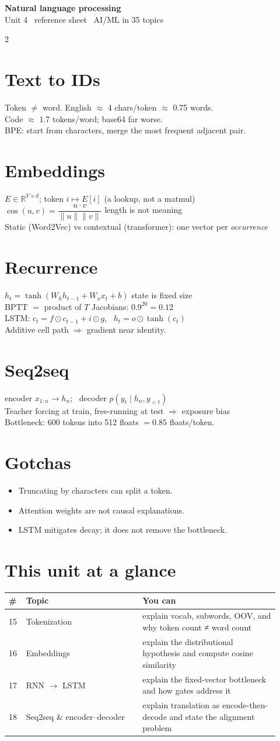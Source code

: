 \documentclass[11pt,a4paper]{article}
\newcommand{\sect}[1]{\section*{#1}}
\newcommand{\hd}[2]{\begin{center}{\large\bfseries #1}\\[-0.1em]{\small\color{gray}#2}\end{center}\vspace{-0.6em}}
\begin{document}
\hd{Natural language processing}{Unit 4 \textperiodcentered\ reference sheet \textperiodcentered\ AI/ML in 35 topics}
\begin{multicols}{2}
\normalsize

\sect{Text to IDs}
Token $\neq$ word. English $\approx$ 4 chars/token $\approx$ 0.75 words.\\
Code $\approx$ 1.7 tokens/word; base64 far worse.\\
BPE: start from characters, merge the most frequent adjacent pair.

\sect{Embeddings}
$E\in\mathbb{R}^{V\times d}$; token $i\mapsto E[i]$ (a lookup, not a matmul)\\
$\cos(u,v)=\dfrac{u\cdot v}{\|u\|\|v\|}$ \quad length is not meaning\\
Static (Word2Vec) vs contextual (transformer): one vector per \emph{occurrence}

\sect{Recurrence}
$h_t=\tanh(W_h h_{t-1}+W_x x_t+b)$ \quad state is fixed size\\
BPTT $=$ product of $T$ Jacobians: $0.9^{20}=0.12$\\
LSTM: $c_t=f\odot c_{t-1}+i\odot g$, \ $h_t=o\odot\tanh(c_t)$\\
Additive cell path $\Rightarrow$ gradient near identity.

\sect{Seq2seq}
encoder $x_{1:n}\to h_n$; \ decoder $p(y_t\mid h_n,y_{<t})$\\
Teacher forcing at train, free-running at test $\Rightarrow$ exposure bias\\
Bottleneck: 600 tokens into 512 floats $=0.85$ floats/token.

\sect{Gotchas}
\begin{itemize}
\item Truncating by characters can split a token.
\item Attention weights are not causal explanations.
\item LSTM mitigates decay; it does not remove the bottleneck.
\end{itemize}

\sect{This unit at a glance}
\begin{tabular}{@{}p{0.05\linewidth}p{0.40\linewidth}p{0.47\linewidth}@{}}
\toprule
\# & Topic & You can\\
\midrule
15 & Tokenization & explain vocab, subwords, OOV, and why token count ≠ word count\\
16 & Embeddings & explain the distributional hypothesis and compute cosine similarity\\
17 & RNN $\rightarrow$ LSTM & explain the fixed-vector bottleneck and how gates address it\\
18 & Seq2seq \& encoder–decoder & explain translation as encode-then-decode and state the alignment problem\\
\bottomrule
\end{tabular}


\end{multicols}
\end{document}

